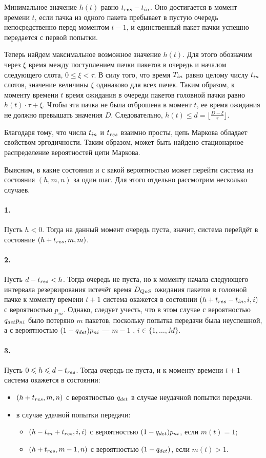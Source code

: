 Минимальное значение $h(t)$ равно $t_{res}-t_{in}$. Оно достигается в момент времени $t$, если пачка из одного пакета пребывает в пустую очередь непосредственно перед моментом $t - 1$, и единственный пакет пачки успешно передается с первой попытки.   

Теперь найдем максимальное возможное значение $h(t)$. Для этого обозначим через $\xi$ время между поступлением пачки пакетов в очередь и началом следующего слота, $0 \leqslant \xi < \tau$. В силу того, что время $T_{in}$ равно целому числу $t_{in}$ слотов, значение величины $\xi$ одинаково для всех пачек. Таким образом, к моменту времени $t$ время ожидания в очереди пакетов головной пачки равно $h(t) \cdot \tau + \xi$. Чтобы эта пачка не была отброшена в момент $t$, ее время ожидания не должно превышать значения $D$. Следовательно, $h(t) \leqslant d = \lfloor \frac{D-\xi}{\tau} \rfloor$. 

Благодаря тому, что числа $t_{in}$ и $t_{res}$ взаимно просты, цепь Маркова обладает свойством эргодичности. Таким образом, может быть найдено стационарное распределение вероятностей цепи Маркова. 

Выясним, в какие состояния и с какой вероятностью может перейти система из состояния $(h, m, n)$ за один шаг. Для этого отдельно рассмотрим несколько случаев.

\paragraph{1.} Пусть $h < 0$. Тогда на данный момент очередь пуста, значит, система перейдёт в состояние $(h + t_{res}, m, m)$.

\paragraph{2.} Пусть $d - t_{res}< h$. Тогда очередь не пуста, но к моменту начала следующего интервала резервирования истечёт время $D_{QoS}$ ожидания пакетов в головной пачке к моменту времени $t + 1$ система окажется в состоянии $(h + t_{res} - t_{in}, i, i)$ с вероятностью $p_{ni}$. Однако, следует учесть, что в этом случае с вероятностью $q_{det} p_{ni}$ было потеряно $m$ пакетов, поскольку попытка передачи была неуспешной, а с вероятностью $(1 - q_{det}) p_{ni}$ --- $m - 1$ , $i \in \{ 1, \ldots, M \}$. 

\paragraph{3.} Пусть $0 \leqslant h \leqslant d - t_{res}$. Тогда очередь не пуста, и к моменту времени $t + 1$ система окажется в состоянии:
\begin{itemize}
\item $(h + t_{res}, m, n)$ с вероятностью $q_{det}$ в случае неудачной попытки передачи.
\item в случае удачной попытки передачи:
	\begin{itemize}
	\item $(h - t_{in} + t_{res}, i, i)$ с вероятностью $(1 - q_{det})p_{ni}$, если $m(t) = 1$;		
	\item $(h + t_{res}, m - 1, n)$ с вероятностью $(1 - q_{det})$, если  $m(t) > 1$.
	\end{itemize}
\end{itemize}

